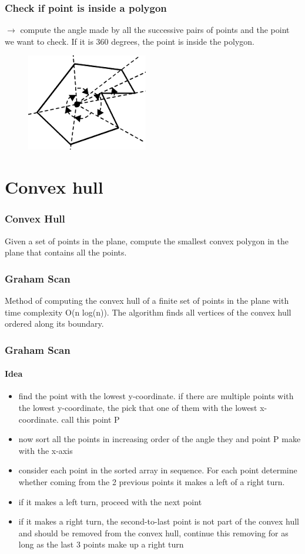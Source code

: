 \documentclass[pdf]{beamer}
\begin{document}
\begin{frame}
	\frametitle{Check if point is inside a polygon}
	$\rightarrow$ compute the angle made by all the successive pairs of points and the point we want to check. If it is 360 degrees, the point is inside the polygon.
	
	\begin{figure}
		\centering
		\includegraphics[width=0.7\linewidth]{winding}
	\end{figure}
\end{frame}

\section{Convex hull}
\begin{frame}
	\frametitle{Convex Hull}
	Given a set of points in the plane, compute the smallest convex polygon in the plane that contains all the points.
\end{frame}

\begin{frame}
	\frametitle{Graham Scan}
	Method of computing the convex hull of a finite set of points in the plane with time complexity O(n log(n)). The algorithm finds all vertices of the convex hull ordered along its boundary.
\end{frame}

\begin{frame}
	\frametitle{Graham Scan}
	\framesubtitle{Idea}
	\begin{itemize}
		\item find the point with the lowest y-coordinate. if there are multiple points with the lowest y-coordinate, the pick that one of them with the lowest x-coordinate. call this point P
		\item now sort all the points in increasing order of the angle they and point P make with the x-axis
		\item consider each point in the sorted array in sequence. For each point determine whether coming from the 2 previous points it makes a left of a right turn.
		\item if it makes a left turn, proceed with the next point
		\item if it makes a right turn, the second-to-last point is not part of the convex hull and should be removed from the convex hull, continue this removing for as long as the last 3 points make up a right turn 
	\end{itemize}
\end{frame}
\end{document}
